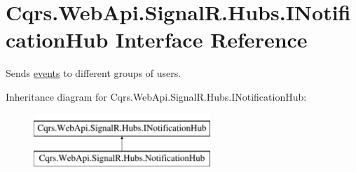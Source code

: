 \hypertarget{interfaceCqrs_1_1WebApi_1_1SignalR_1_1Hubs_1_1INotificationHub}{}\section{Cqrs.\+Web\+Api.\+Signal\+R.\+Hubs.\+I\+Notification\+Hub Interface Reference}
\label{interfaceCqrs_1_1WebApi_1_1SignalR_1_1Hubs_1_1INotificationHub}


Sends \hyperlink{}{events} to different groups of users.  


Inheritance diagram for Cqrs.\+Web\+Api.\+Signal\+R.\+Hubs.\+I\+Notification\+Hub\+:\begin{figure}[H]
\begin{center}
\leavevmode
\includegraphics[height=2.000000cm]{interfaceCqrs_1_1WebApi_1_1SignalR_1_1Hubs_1_1INotificationHub}
\end{center}
\end{figure}
